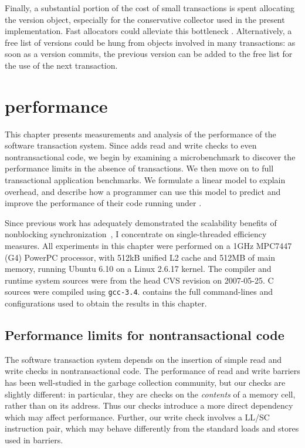 Finally, a substantial portion of the cost of small transactions is
spent allocating the version object, especially for the conservative
collector used in the present implementation.  Fast allocators could
alleviate this bottleneck \cite{Appel89}.  Alternatively, a free list
of versions could be hung from objects involved in many transactions:
as soon as a version commits, the previous version can be added to the
free list for the use of the next transaction.

\chapter{\apex performance}\label{cha:perf}

This chapter presents measurements and analysis of the performance of
the \apex software transaction system.  Since \apex adds read and
write checks to even nontransactional code, we begin by examining a
microbenchmark to discover the performance limits in the absence of
transactions.  We then move on to full transactional application
benchmarks.  We formulate a linear model to explain \apex overhead,
and describe how a programmer can use this model to predict and
improve the performance of their code running under \apex.

Since previous work has adequately demonstrated the scalability
benefits of nonblocking
synchronization~\cite{LaMarca94,GreenwaldCh96,MassalinPu91,RajwarGo01,RajwarGo02,HammondWoCh04,AnanianAsKuLeLi05},
I concentrate on single-threaded efficiency measures.
All experiments in this chapter were performed on a 1GHz MPC7447 (G4)
PowerPC processor,
with 512kB unified L2 cache and 512MB of main memory, running Ubuntu
6.10 on a Linux 2.6.17 kernel.  The \flex compiler and runtime system
sources were from the head CVS revision on 2007-05-25.  C sources were
compiled using \texttt{gcc-3.4}.  
contains the full \flex command-lines and configurations used to obtain the
results in this chapter.

\section{Performance limits for nontransactional code}
\label{sec:counter-bench}
The \apex software transaction system depends on
the insertion of simple read and write checks in nontransactional
code.  The performance of read and write barriers has been
well-studied in the garbage collection community, but our checks are
slightly different: in particular, they are checks on the
\textit{contents} of a memory cell, rather than on its address.  
Thus our checks
introduce a more direct dependency which may affect performance.
Further, our write check involves a LL/SC instruction pair, which may
behave differently from the standard loads and stores used in
barriers.

